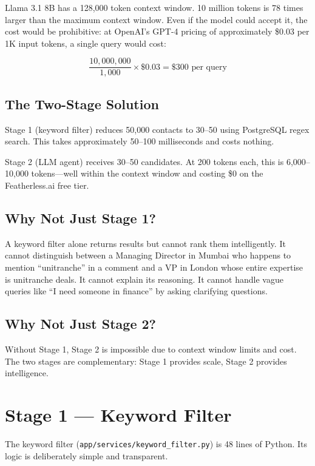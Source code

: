 \documentclass[12pt, a4paper]{report}
\begin{document}
Llama 3.1 8B has a 128,000 token context window. 10 million tokens is 78 times larger than the maximum context window. Even if the model could accept it, the cost would be prohibitive: at OpenAI's GPT-4 pricing of approximately \$0.03 per 1K input tokens, a single query would cost:

\[
\frac{10,000,000}{1,000} \times \$0.03 = \$300 \text{ per query}
\]

\subsection{The Two-Stage Solution}

Stage 1 (keyword filter) reduces 50,000 contacts to 30--50 using PostgreSQL regex search. This takes approximately 50--100 milliseconds and costs nothing.

Stage 2 (LLM agent) receives 30--50 candidates. At 200 tokens each, this is 6,000--10,000 tokens---well within the context window and costing \$0 on the Featherless.ai free tier.

\subsection{Why Not Just Stage 1?}

A keyword filter alone returns results but cannot rank them intelligently. It cannot distinguish between a Managing Director in Mumbai who happens to mention ``unitranche'' in a comment and a VP in London whose entire expertise is unitranche deals. It cannot explain its reasoning. It cannot handle vague queries like ``I need someone in finance'' by asking clarifying questions.

\subsection{Why Not Just Stage 2?}

Without Stage 1, Stage 2 is impossible due to context window limits and cost. The two stages are complementary: Stage 1 provides scale, Stage 2 provides intelligence.

\section{Stage 1 --- Keyword Filter}

The keyword filter (\texttt{app/services/keyword\_filter.py}) is 48 lines of Python. Its logic is deliberately simple and transparent.
\end{document}
